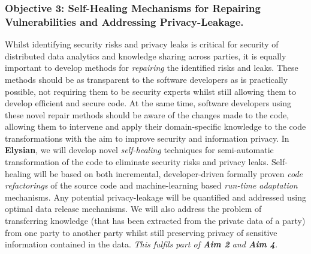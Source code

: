 \documentclass[a4paper,11pt]{article}
\newcommand{\project}[1]{\textbf{#1}\xspace}
\newcommand{\SECURITY}{\project{Elysian}}
\newcommand{\TheProject}{\SECURITY}
\begin{document}
\subsubsection*{Objective 3: Self-Healing Mechanisms for Repairing Vulnerabilities and Addressing Privacy-Leakage.}
Whilst identifying security risks and privacy leaks is critical for security of distributed data analytics and knowledge sharing across parties, it is equally important to develop methods for \emph{repairing} the identified risks and leaks. These methods should be as transparent to the software developers as is practically possible, not requiring them to be security experts whilst still allowing them to develop efficient and secure code. At the same time, software developers 
using these novel repair methods
should be aware of the changes made to the code, allowing them to intervene and apply their domain-specific knowledge to the code transformations with the aim to improve security and information privacy. In \TheProject{}, we will develop novel \emph{self-healing} techniques for semi-automatic transformation of the code to eliminate security risks and privacy leaks. Self-healing will be based on both incremental, developer-driven formally proven \emph{code refactorings} of the source code and machine-learning based \emph{run-time adaptation} mechanisms. Any potential privacy-leakage will be quantified and addressed using optimal data release mechanisms. We will also address the problem of transferring knowledge (that has been extracted from the private data of a party) from one party to another party whilst still preserving privacy of sensitive information contained in the data. \emph{This fulfils part of \textbf{Aim 2} and \textbf{Aim 4}.}

\end{document}
